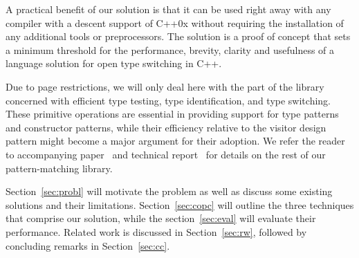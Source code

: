 \noindent
A practical benefit of our solution is that it can be used right away with any 
compiler with a descent support of C++0x without requiring the installation of 
any additional tools or preprocessors. The solution is a proof of concept that 
sets a minimum threshold for the performance, brevity, clarity and usefulness of 
a language solution for open type switching in C++.

Due to page restrictions, we will only deal here with the part of the library 
concerned with efficient type testing, type identification, and type switching. 
These primitive operations are essential in providing support for type patterns 
and constructor patterns, while their efficiency relative to the visitor design 
pattern might become a major argument for their adoption. We refer the reader to 
accompanying paper~\cite{AP} and technical report~\cite{TR} for details on the 
rest of our pattern-matching library.

Section~\ref{sec:probl} will motivate the problem as well as discuss some 
existing solutions and their limitations. Section~\ref{sec:copc} will outline 
the three techniques that comprise our solution, while the 
section~\ref{sec:eval} will evaluate their performance. Related work is 
discussed in Section~\ref{sec:rw}, followed by concluding remarks in 
Section~\ref{sec:cc}.

